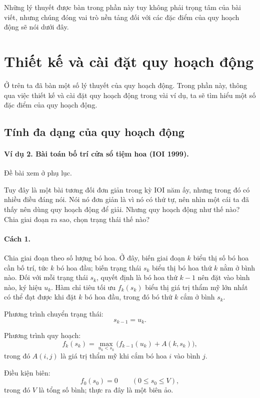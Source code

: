 \documentclass[11pt]{article}
\begin{document}
Những lý thuyết được bàn trong phần này tuy không phải trọng tâm của bài
viết, nhưng chúng đóng vai trò nền tảng đối với các đặc điểm của quy hoạch
động sẽ nói dưới đây.

\section{Thiết kế và cài đặt quy hoạch động}

Ở trên ta đã bàn một số lý thuyết của quy hoạch động. Trong phần này, thông
qua việc thiết kế và cài đặt quy hoạch động trong vài ví dụ, ta sẽ tìm hiểu
một số đặc điểm của quy hoạch động.

\subsection{Tính đa dạng của quy hoạch động}

\paragraph{Ví dụ 2. Bài toán bố trí cửa sổ tiệm hoa (IOI 1999).}
Đề bài xem ở phụ lục.

Tuy đây là một bài tương đối đơn giản trong kỳ IOI năm ấy, nhưng trong đó có
nhiều điều đáng nói. Nói nó đơn giản là vì nó có thứ tự, nên nhìn một cái ta
đã thấy nên dùng quy hoạch động để giải. Nhưng quy hoạch động như thế nào?
Chia giai đoạn ra sao, chọn trạng thái thế nào?

\paragraph{Cách 1.}
Chia giai đoạn theo số lượng bó hoa. Ở đây, biến giai đoạn \(k\) biểu thị số
bó hoa cần bố trí, tức \(k\) bó hoa đầu; biến trạng thái \(s_k\) biểu thị
bó hoa thứ \(k\) nằm ở bình nào. Đối với mỗi trạng thái \(s_k\), quyết định
là bó hoa thứ \(k-1\) nên đặt vào bình nào, ký hiệu \(u_k\). Hàm chỉ tiêu tối
ưu \(f_k(s_k)\) biểu thị giá trị thẩm mỹ lớn nhất có thể đạt được khi đặt
\(k\) bó hoa đầu, trong đó bó thứ \(k\) cắm ở bình \(s_k\).

Phương trình chuyển trạng thái:
\[
  s_{k-1}=u_k.
\]

Phương trình quy hoạch:
\[
  f_k(s_k)=\max_{u_k<s_k}\bigl(f_{k-1}(u_k)+A(k,s_k)\bigr),
\]
trong đó \(A(i,j)\) là giá trị thẩm mỹ khi cắm bó hoa \(i\) vào bình \(j\).

Điều kiện biên:
\[
  f_0(s_0)=0\qquad (0\le s_0\le V),
\]
trong đó \(V\) là tổng số bình; thực ra đây là một biên ảo.
\end{document}
